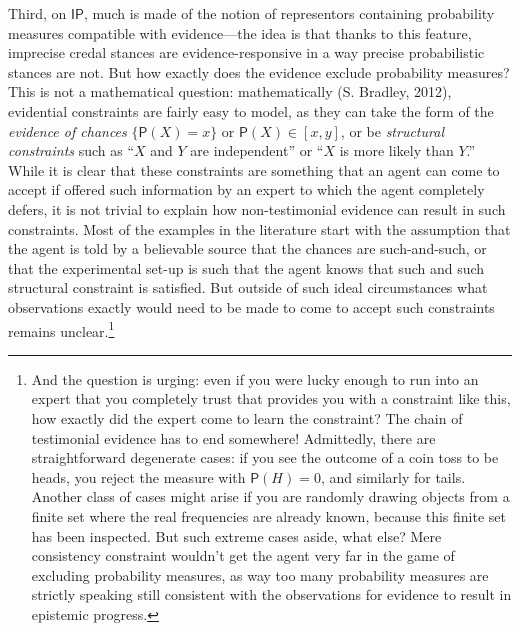\documentclass[
  10pt,
  dvipsnames,enabledeprecatedfontcommands]{scrartcl}
\newcommand{\s}[1]{\mbox{$\mathsf{#1}$}}
\begin{document}
Third, on \s{IP}, much is made of the notion of representors containing
probability measures compatible with evidence---the idea is that thanks
to this feature, imprecise credal stances are evidence-responsive in a
way precise probabilistic stances are not. But how exactly does the
evidence exclude probability measures? This is not a mathematical
question: mathematically (S. Bradley, 2012), evidential constraints are
fairly easy to model, as they can take the form of the
\emph{evidence of chances} \(\{ \mathsf{P}(X) = x\}\) or
\(\mathsf{P}(X) \in [x,y]\), or be \emph{structural constraints} such as
``\(X\) and \(Y\) are independent'' or ``\(X\) is more likely than
\(Y\).'' While it is clear that these constraints are something that an
agent can come to accept if offered such information by an expert to
which the agent completely defers, it is not trivial to explain how
non-testimonial evidence can result in such constraints. Most of the
examples in the literature start with the assumption that the agent is
told by a believable source that the chances are such-and-such, or that
the experimental set-up is such that the agent knows that such and such
structural constraint is satisfied. But outside of such ideal
circumstances what observations exactly would need to be made to come to
accept such constraints remains unclear.\footnote{And the question is
  urging: even if you were lucky enough to run into an expert that you
  completely trust that provides you with a constraint like this, how
  exactly did the expert come to learn the constraint? The chain of
  testimonial evidence has to end somewhere! Admittedly, there are
  straightforward degenerate cases: if you see the outcome of a coin
  toss to be heads, you reject the measure with \(\mathsf{P}(H)=0\), and
  similarly for tails. Another class of cases might arise if you are
  randomly drawing objects from a finite set where the real frequencies
  are already known, because this finite set has been inspected. But
  such extreme cases aside, what else? Mere consistency constraint
  wouldn't get the agent very far in the game of excluding probability
  measures, as way too many probability measures are strictly speaking
  still consistent with the observations for evidence to result in
  epistemic progress.}
\end{document}
